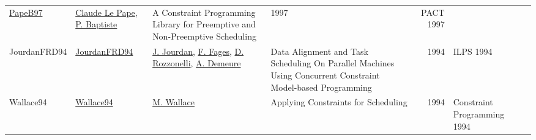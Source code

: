 {\begin{longtable}{llp{5cm}p{10cm}rp{3cm}l}
\href{}{PapeB97} & \hyperref[auth:a164]{Claude Le Pape}, \hyperref[auth:a163]{P. Baptiste} & A Constraint Programming Library for Preemptive and Non-Preemptive Scheduling & 1997 & PACT 1997 & \cite{PapeB97}\\JourdanFRD94 & \href{}{JourdanFRD94} & \hyperref[auth:a707]{J. Jourdan}, \hyperref[auth:a708]{F. Fages}, \hyperref[auth:a709]{D. Rozzonelli}, \hyperref[auth:a710]{A. Demeure} & Data Alignment and Task Scheduling On Parallel Machines Using Concurrent Constraint Model-based Programming & 1994 & ILPS 1994 & \cite{JourdanFRD94}\\Wallace94 & \href{}{Wallace94} & \hyperref[auth:a117]{M. Wallace} & Applying Constraints for Scheduling & 1994 & Constraint Programming 1994 & \cite{Wallace94}\\\end{longtable}
}

